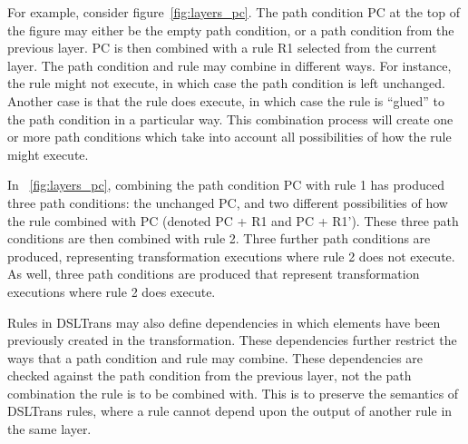 For example, consider figure~\ref{fig:layers_pc}. The path condition PC at the top of the figure may either be the empty path condition, or a path condition from the previous layer. PC is then combined with a rule R1 
selected from the current layer. The path condition and rule may combine in different ways. For instance, the rule might not execute, in which case the path condition is left unchanged. Another case is that the rule does execute, in which case the rule is ``glued'' to the path condition in a particular way. This combination process will create one or more path conditions which take into account all possibilities of how the rule might execute.

In ~\ref{fig:layers_pc}, combining the path condition PC with rule 1 has produced three path conditions: the unchanged PC, and two different possibilities of how the rule combined with PC (denoted PC + R1 and PC + R1'). These three path conditions are then combined with rule 2. Three further path conditions are produced, representing transformation executions where rule 2 does not execute. As well, three path conditions are produced that represent transformation executions where rule 2 does execute.

%
%                        


Rules in DSLTrans may also define dependencies in which elements have been previously created in the transformation. These dependencies further restrict the ways that a path condition and rule may combine. These dependencies are checked against the path condition from the previous layer, not the path combination the rule is to be combined with. This is to preserve the semantics of DSLTrans rules, where a rule cannot depend upon the output of another rule in the same layer.




